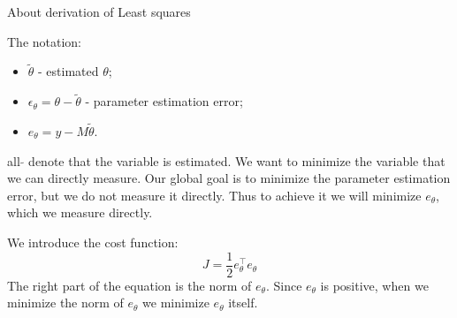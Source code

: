 \documentclass[12pt]{article}
\begin{document}
\bigskip

\begin{center}
    About derivation of Least squares
\end{center}
\begin{flushleft}

The notation:
\begin{itemize}
    \item $\widetilde {\theta }$ - estimated $\theta$;
    \item $ \epsilon_{\theta} = \theta - \widetilde{\theta}$ - parameter estimation error;
    \item $e_{\theta} = y - M \widetilde{\theta}$.
\end{itemize}
 all $\widetilde{ }$ denote that the variable is estimated.
\bigskip
We want to minimize the variable that we can directly measure. Our global goal is to minimize the parameter estimation error, but we do not measure it directly. Thus to achieve it we will minimize $e_{\theta}$, which we measure directly.
\bigskip

We introduce the cost function:
\[
J = \frac{1}{2}e_{\theta}^\top e_{\theta}
\]
The right part of the equation is the norm of $e_{\theta}$. Since $e_{\theta}$ is positive, when we minimize the norm of $e_{\theta}$ we minimize $e_{\theta}$ itself.

\end{flushleft}
\end{document}

